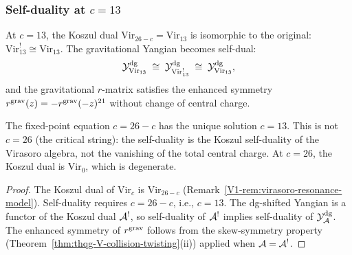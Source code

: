 \subsubsection{Self-duality at $c = 13$}

\begin{proposition}[Self-duality of the gravitational Yangian at
$c = 13$; \ClaimStatusProvedHere]
At $c = 13$, the Koszul dual $\mathrm{Vir}_{26-c} = \mathrm{Vir}_{13}$
is isomorphic to the original: $\mathrm{Vir}_{13}^! \cong
\mathrm{Vir}_{13}$. The gravitational Yangian becomes self-dual:
\begin{equation}%
\Ydg_{\mathrm{Vir}_{13}}
\;\cong\;
\Ydg_{\mathrm{Vir}_{13}^!}
\;\cong\;
\Ydg_{\mathrm{Vir}_{13}},
\end{equation}
and the gravitational $r$-matrix satisfies the enhanced symmetry
$r^{\mathrm{grav}}(z) = -r^{\mathrm{grav}}(-z)^{21}$ without change of central charge.

The fixed-point equation $c = 26 - c$ has the unique solution
$c = 13$. This is not $c = 26$ (the critical string): the
self-duality is the Koszul self-duality of the Virasoro algebra,
not the vanishing of the total central charge. At $c = 26$, the
Koszul dual is $\mathrm{Vir}_0$, which is degenerate.
\end{proposition}

\begin{proof}
The Koszul dual of $\mathrm{Vir}_c$ is $\mathrm{Vir}_{26-c}$
(Remark~\ref{V1-rem:virasoro-resonance-model}).
Self-duality requires $c = 26 - c$, i.e., $c = 13$.
The dg-shifted Yangian is a functor of the Koszul dual
$\mathcal{A}^!$, so self-duality of $\mathcal{A}^!$ implies self-duality of
$\mathcal{Y}^{\mathrm{dg}}_{\mathcal{A}}$. The enhanced symmetry of $r^{\mathrm{grav}}$ follows from the
skew-symmetry property (Theorem~\ref{thm:thqg-V-collision-twisting}(ii))
applied when $\mathcal{A} = \mathcal{A}^!$.
\end{proof}


